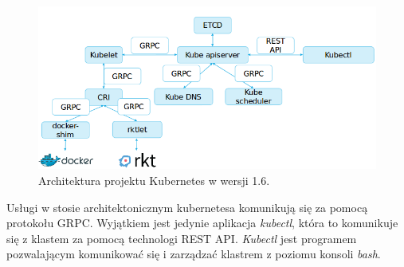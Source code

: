 \documentclass[10pt,a4paper,titlepage,twoside]{report}
\begin{document}
\begin{figure}[!h]
	\centering
	\includegraphics[scale=0.7]{pics/k8s_1_6.png}
	\caption{Architektura projektu Kubernetes w wersji 1.6.}
	\label{k8s_1_6}
\end{figure}

Usługi w stosie architektonicznym kubernetesa komunikują się za pomocą protokołu GRPC. Wyjątkiem jest jedynie aplikacja \textit{kubectl}, która to komunikuje się z klastem za pomocą technologi REST API. \textit{Kubectl} jest programem pozwalającym komunikować się i zarządzać klastrem z poziomu konsoli \textit{bash}.
\end{document}
